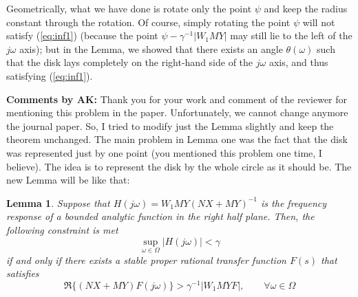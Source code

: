 \documentclass[12pt]{article}
\newtheorem{lemma}{Lemma}
\begin{document}
Geometrically, what we have done is rotate only the point $\psi$ and keep the radius constant through the rotation. Of course, simply rotating the point $\psi$ will not satisfy (\ref{eq:inf1}) (because the point $\psi - \gamma^{-1}|W_1MY|$ may still lie to the left of the $j\omega$ axis); but in the Lemma, we showed that there exists an angle $\theta(\omega)$ such that the disk lays completely on the right-hand side of the $j\omega$ axis, and thus satisfying (\ref{eq:inf1}). 

{\bf Comments by AK:} Thank you for your work and comment of the reviewer for mentioning this problem in the paper. Unfortunately, we cannot change anymore the journal paper. So, I tried to modify just the Lemma slightly and keep the theorem unchanged. The main problem in Lemma one was the fact that the disk was represented just by one point (you mentioned this problem one time, I believe). The idea is to represent the disk by the whole circle as it should be. The new Lemma will be like that:

\begin{lemma}   \label{lem2}
Suppose that $H(j\omega)={W_1MY} (NX+MY)^{-1}$ is the frequency response of a bounded analytic function in the right half plane. Then, the following constraint is met
\begin{equation} \label{eq4}
\sup_{\omega \in \Omega}  |H(j\omega )| < \gamma
\end{equation}
if and only if there exists a stable proper rational transfer function $F(s)$ that satisfies
$$
\Re\{(NX + MY)F(j\omega)\}>\gamma ^{-1}|W_1MYF|,  \qquad \forall \omega \in \Omega 
$$
\end{lemma}
\end{document}
